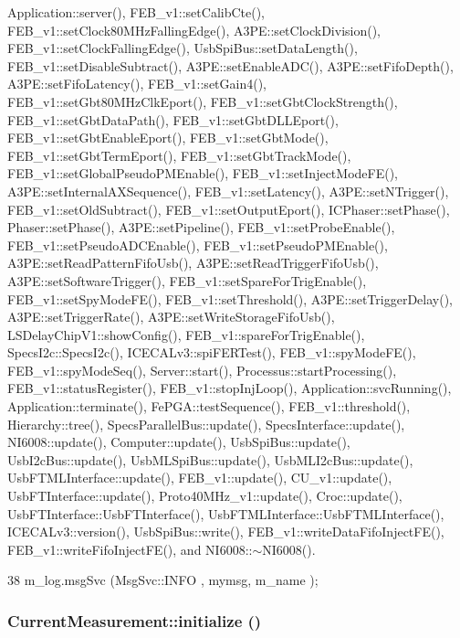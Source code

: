 Application::server(), FEB\_\-v1::setCalibCte(), FEB\_\-v1::setClock80MHzFallingEdge(), A3PE::setClockDivision(), FEB\_\-v1::setClockFallingEdge(), UsbSpiBus::setDataLength(), FEB\_\-v1::setDisableSubtract(), A3PE::setEnableADC(), A3PE::setFifoDepth(), A3PE::setFifoLatency(), FEB\_\-v1::setGain4(), FEB\_\-v1::setGbt80MHzClkEport(), FEB\_\-v1::setGbtClockStrength(), FEB\_\-v1::setGbtDataPath(), FEB\_\-v1::setGbtDLLEport(), FEB\_\-v1::setGbtEnableEport(), FEB\_\-v1::setGbtMode(), FEB\_\-v1::setGbtTermEport(), FEB\_\-v1::setGbtTrackMode(), FEB\_\-v1::setGlobalPseudoPMEnable(), FEB\_\-v1::setInjectModeFE(), A3PE::setInternalAXSequence(), FEB\_\-v1::setLatency(), A3PE::setNTrigger(), FEB\_\-v1::setOldSubtract(), FEB\_\-v1::setOutputEport(), ICPhaser::setPhase(), Phaser::setPhase(), A3PE::setPipeline(), FEB\_\-v1::setProbeEnable(), FEB\_\-v1::setPseudoADCEnable(), FEB\_\-v1::setPseudoPMEnable(), A3PE::setReadPatternFifoUsb(), A3PE::setReadTriggerFifoUsb(), A3PE::setSoftwareTrigger(), FEB\_\-v1::setSpareForTrigEnable(), FEB\_\-v1::setSpyModeFE(), FEB\_\-v1::setThreshold(), A3PE::setTriggerDelay(), A3PE::setTriggerRate(), A3PE::setWriteStorageFifoUsb(), LSDelayChipV1::showConfig(), FEB\_\-v1::spareForTrigEnable(), SpecsI2c::SpecsI2c(), ICECALv3::spiFERTest(), FEB\_\-v1::spyModeFE(), FEB\_\-v1::spyModeSeq(), Server::start(), Processus::startProcessing(), FEB\_\-v1::statusRegister(), FEB\_\-v1::stopInjLoop(), Application::svcRunning(), Application::terminate(), FePGA::testSequence(), FEB\_\-v1::threshold(), Hierarchy::tree(), SpecsParallelBus::update(), SpecsInterface::update(), NI6008::update(), Computer::update(), UsbSpiBus::update(), UsbI2cBus::update(), UsbMLSpiBus::update(), UsbMLI2cBus::update(), UsbFTMLInterface::update(), FEB\_\-v1::update(), CU\_\-v1::update(), UsbFTInterface::update(), Proto40MHz\_\-v1::update(), Croc::update(), UsbFTInterface::UsbFTInterface(), UsbFTMLInterface::UsbFTMLInterface(), ICECALv3::version(), UsbSpiBus::write(), FEB\_\-v1::writeDataFifoInjectFE(), FEB\_\-v1::writeFifoInjectFE(), and NI6008::$\sim$NI6008().


\begin{DoxyCode}
38 { m_log.msgSvc (MsgSvc::INFO    , mymsg, m_name ); }
\end{DoxyCode}
\hypertarget{classCurrentMeasurement_a88d397682cb5847d5710d08544b6f4c6}{
\subsubsection[{initialize}]{ CurrentMeasurement::initialize ()}}
\label{classCurrentMeasurement_a88d397682cb5847d5710d08544b6f4c6}


